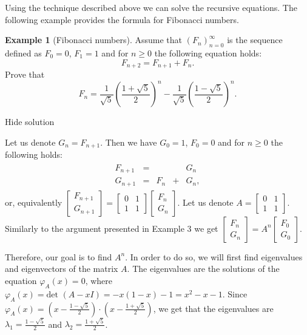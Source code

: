 \documentclass[11pt]{article}
\theoremstyle{definition}
\newtheorem{exmp}[thm]{Example}
\theoremstyle{plain}
\begin{document}
Using the technique described above we can solve the recursive equations. The following example provides the formula for Fibonacci numbers.

\begin{exmp}[Fibonacci numbers]
Assume that \( (F_n)_{n=0}^{\infty} \) is the sequence defined as \( F_0=0 \), \( F_1=1 \) and for \( n\geq 0 \) the following equation holds: \[ F_{n+2}=F_{n+1}+F_n.\] Prove that \[ F_n=\frac1{\sqrt 5}\left(\frac{1+\sqrt 5}2\right)^n-\frac1{\sqrt 5}\left(\frac{1-\sqrt 5}2\right)^n.\]
\end{exmp}

Hide solution

Let us denote \( G_n=F_{n+1} \). Then we have \( G_0=1 \), \( F_0=0 \) and for \( n\geq 0 \) the following holds: \begin{eqnarray*} \begin{array}{ccccc} F_{n+1}&=& & &G_n\\ G_{n+1}&=&F_n&+&G_n, \end{array} \end{eqnarray*} or, equivalently \( \left[\begin{array}{c}F_{n+1}\\G_{n+1}\end{array}\right]= \left[\begin{array}{cc}0&1\\1&1\end{array}\right] \left[\begin{array}{c}F_{n}\\G_{n}\end{array}\right]\). Let us denote \( A=\left[\begin{array}{cc}0&1\\1&1\end{array}\right]\). Similarly to the argument presented in Example 3 we get \( \left[\begin{array}{c}F_{n}\\G_{n}\end{array}\right]=A^n\left[\begin{array}{c}F_{0}\\G_{0}\end{array}\right]\).

Therefore, our goal is to find \( A^n \). In order to do so, we will first find eigenvalues and eigenvectors of the matrix \( A \). The eigenvalues are the solutions of the equation \( \varphi_A(x)=0 \), where \(  \varphi_A(x)=\mbox{det }(A-xI)=-x(1-x)-1=x^2-x-1 \). Since \(  \varphi_A(x)=\left(x-\frac{1-\sqrt 5}2\right)\cdot \left(x-\frac{1+\sqrt 5}2\right) \), we get that the eigenvalues are \(  \lambda_1=\frac{1-\sqrt 5}2 \) and \(  \lambda_2=\frac{1+\sqrt 5}2 \).
\end{document}
